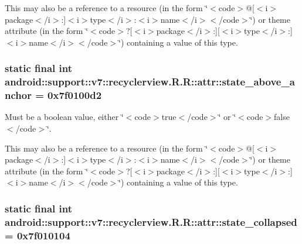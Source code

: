 This may also be a reference to a resource (in the form \char`\"{}$<$code$>$@\mbox{[}$<$i$>$package$<$/i$>$:\mbox{]}$<$i$>$type$<$/i$>$:$<$i$>$name$<$/i$>$$<$/code$>$\char`\"{}) or theme attribute (in the form \char`\"{}$<$code$>$?\mbox{[}$<$i$>$package$<$/i$>$:\mbox{]}\mbox{[}$<$i$>$type$<$/i$>$:\mbox{]}$<$i$>$name$<$/i$>$$<$/code$>$\char`\"{}) containing a value of this type. \hypertarget{classandroid_1_1support_1_1v7_1_1recyclerview_1_1_r_1_1attr_ffd878401e6706e5a0b754b28fec2720}{
\subsubsection[{state\_\-above\_\-anchor}]{\setlength{\rightskip}{0pt plus 5cm}static final int android::support::v7::recyclerview.R.R::attr::state\_\-above\_\-anchor = 0x7f0100d2}}
\label{classandroid_1_1support_1_1v7_1_1recyclerview_1_1_r_1_1attr_ffd878401e6706e5a0b754b28fec2720}


Must be a boolean value, either \char`\"{}$<$code$>$true$<$/code$>$\char`\"{} or \char`\"{}$<$code$>$false$<$/code$>$\char`\"{}. 

This may also be a reference to a resource (in the form \char`\"{}$<$code$>$@\mbox{[}$<$i$>$package$<$/i$>$:\mbox{]}$<$i$>$type$<$/i$>$:$<$i$>$name$<$/i$>$$<$/code$>$\char`\"{}) or theme attribute (in the form \char`\"{}$<$code$>$?\mbox{[}$<$i$>$package$<$/i$>$:\mbox{]}\mbox{[}$<$i$>$type$<$/i$>$:\mbox{]}$<$i$>$name$<$/i$>$$<$/code$>$\char`\"{}) containing a value of this type. \hypertarget{classandroid_1_1support_1_1v7_1_1recyclerview_1_1_r_1_1attr_cc0e73ca989d889d204cd23c847591c0}{
\subsubsection[{state\_\-collapsed}]{\setlength{\rightskip}{0pt plus 5cm}static final int android::support::v7::recyclerview.R.R::attr::state\_\-collapsed = 0x7f010104}}
\label{classandroid_1_1support_1_1v7_1_1recyclerview_1_1_r_1_1attr_cc0e73ca989d889d204cd23c847591c0}


